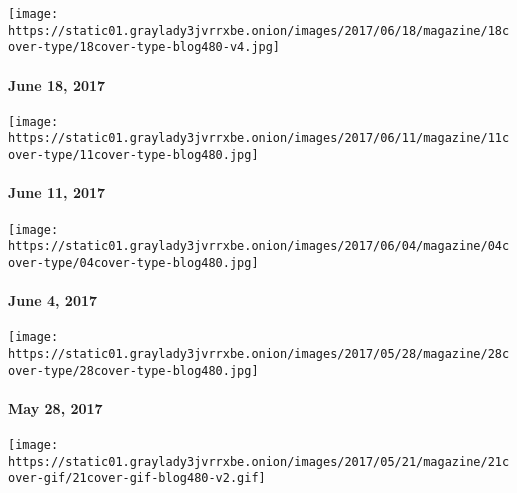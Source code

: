 \href{https://www.nytimes3xbfgragh.onion/issue/magazine/2017/06/16/magazine-index-20170618}{}

\texttt{[image: https://static01.graylady3jvrrxbe.onion/images/2017/06/18/magazine/18cover-type/18cover-type-blog480-v4.jpg]}

\hypertarget{june-18-2017}{%
\paragraph{June 18, 2017}\label{june-18-2017}}

\href{https://www.nytimes3xbfgragh.onion/issue/magazine/2017/06/09/the-61117-issue-20170611}{}

\texttt{[image: https://static01.graylady3jvrrxbe.onion/images/2017/06/11/magazine/11cover-type/11cover-type-blog480.jpg]}

\hypertarget{june-11-2017}{%
\paragraph{June 11, 2017}\label{june-11-2017}}

\href{https://www.nytimes3xbfgragh.onion/issue/magazine/2017/06/02/magazine-index-20170604}{}

\texttt{[image: https://static01.graylady3jvrrxbe.onion/images/2017/06/04/magazine/04cover-type/04cover-type-blog480.jpg]}

\hypertarget{june-4-2017}{%
\paragraph{June 4, 2017}\label{june-4-2017}}

\href{https://www.nytimes3xbfgragh.onion/issue/magazine/2017/05/26/magazine-index-20170528}{}

\texttt{[image: https://static01.graylady3jvrrxbe.onion/images/2017/05/28/magazine/28cover-type/28cover-type-blog480.jpg]}

\hypertarget{may-28-2017}{%
\paragraph{May 28, 2017}\label{may-28-2017}}

\href{https://www.nytimes3xbfgragh.onion/issue/magazine/2017/05/19/magazine-index-20170521}{}

\texttt{[image: https://static01.graylady3jvrrxbe.onion/images/2017/05/21/magazine/21cover-gif/21cover-gif-blog480-v2.gif]}

